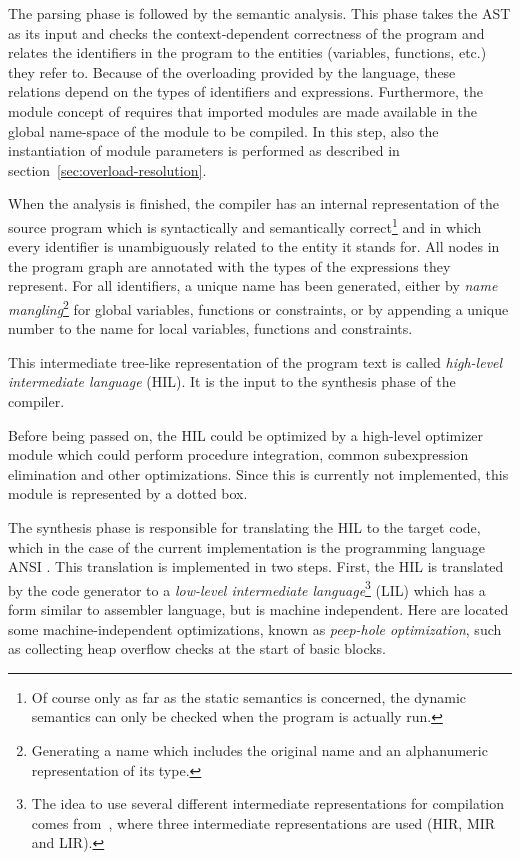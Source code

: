 %
The parsing phase is followed by the semantic analysis.  This phase
takes the AST as its input and checks the context-dependent
correctness of the program and relates the identifiers in the program
to the entities (variables, functions, etc.) they refer to.  Because
of the overloading provided by the language, these relations depend on
the types of identifiers and expressions.  Furthermore, the module
concept of \turtle{} requires that imported modules are made available
in the global name-space of the module to be compiled.  In this step,
also the instantiation of module parameters is performed as described
in section~\ref{sec:overload-resolution}.

%
When the analysis is finished, the compiler has an internal
representation of the source program which is syntactically and
semantically correct\footnote{Of course only as far as the static
  semantics is concerned, the dynamic semantics can only be checked
  when the program is actually run.} and in which every identifier is
unambiguously related to the entity it stands for.  All nodes in the
program graph are annotated with the types of the expressions they
represent.  For all identifiers, a unique name has been generated,
either by {\em name mangling}\footnote{Generating a name which
  includes the original name and an alphanumeric representation of its
  type.} for global variables, functions or constraints, or by
appending a unique number to the name for local variables, functions
and constraints.



This intermediate tree-like representation of the program text is
called {\em high-level intermediate language} (HIL).  It is the input
to the synthesis phase of the compiler.

Before being passed on, the HIL could be optimized by a high-level
optimizer module which could perform procedure integration, common
subexpression elimination and other optimizations.  Since this is
currently not implemented, this module is represented by a dotted box.

%
The synthesis phase is responsible for translating the HIL to the
target code, which in the case of the current \turtle{} implementation
is the programming language ANSI \cee{}.  This translation is
implemented in two steps.  First, the HIL is translated by the code
generator to a {\em low-level intermediate language}\footnote{The idea
  to use several different intermediate representations for
  compilation comes from~\cite{muchnick97advancedcompiler}, where
  three intermediate representations are used (HIR, MIR and LIR).}
(LIL) which has a form similar to assembler language, but is machine
independent.  Here are located some machine-independent optimizations,
known as {\em peep-hole optimization}, such as collecting heap
overflow checks at the start of basic blocks.

